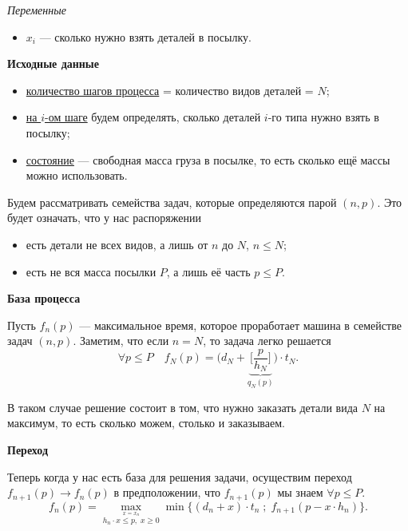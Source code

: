 \textit{Переменные}

\begin{itemize}[nosep]	
	\item $x_i$ --- сколько нужно взять деталей в посылку.
\end{itemize}

\bigskip

\textbf{Исходные данные}

\begin{itemize}[nosep]
	\item \underline{количество шагов процесса} = количество видов деталей = $N$;
	
	\item \underline{на $i$-ом шаге} будем определять, сколько деталей $i$-го типа нужно взять в посылку;
	
	\item \underline{состояние} --- свободная масса груза в посылке, то есть сколько ещё массы можно использовать.
\end{itemize}

Будем рассматривать семейства задач, которые определяются парой $(n, p)$. Это будет означать, что у нас распоряжении
\begin{itemize}[nosep]
	\item есть детали не всех видов, а лишь от $n$ до $N$, $n \le N$;
	
	\item есть не вся масса посылки $P$, а лишь её часть $p \le P$.
\end{itemize}

\bigskip

\textbf{База процесса}

Пусть $f_n(p)$ --- максимальное время, которое проработает машина в семействе задач $(n, p)$. Заметим, что если $n = N$, то задача легко решается
\[
\forall p \le P \quad f_N(p) = \bigg(d_N + \underbrace{\bigg[\frac{p}{h_N}\bigg]}_{q_N(p)}\bigg) \cdot t_N.
\]

В таком случае решение состоит в том, что нужно заказать детали вида $N$ на максимум, то есть сколько можем, столько и заказываем.

\bigskip

\textbf{Переход}

Теперь когда у нас есть база для решения задачи, осуществим переход $f_{n+1}(p) \to f_n(p)$ в предположении, что $f_{n+1}(p)$ мы знаем $\forall p \le P$.
\[
\boxed{f_n(p) = \max_{\stackrel{x = x_n}{h_n \cdot x \le p, \; x \ge 0}} \min\Big\{(d_n + x) \cdot t_n \; ; \; f_{n+1}(p - x \cdot h_n)\Big\}}.
\]

